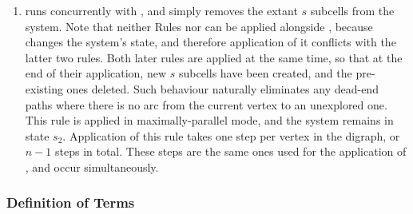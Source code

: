 \begin{enumerate}
    \item {} runs concurrently with , and simply removes the extant \(s\) subcells from the system.  Note that neither Rules  nor  can be applied alongside , because  changes the system's state, and therefore application of it conflicts with the latter two rules.  Both later rules are applied at the same time, so that at the end of their application, new \(s\) subcells have been created, and the pre-existing ones deleted.  Such behaviour naturally eliminates any dead-end paths where there is no arc from the current vertex to an unexplored one.  This rule is applied in maximally-parallel mode, and the system remains in state \(s_2\).  Application of this rule takes one step per vertex in the digraph, or \(n - 1\) steps in total.  These steps are the same ones used for the application of , and occur simultaneously.
\end{enumerate}

\subsubsection{\label{sec:tsp:hppterms}Definition of Terms}

